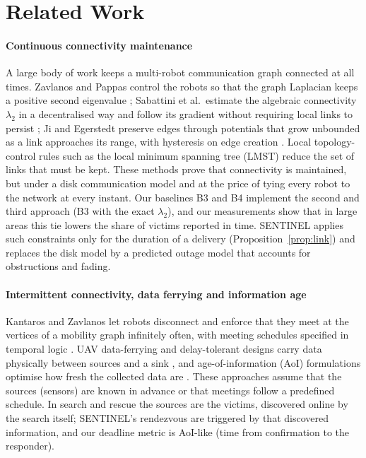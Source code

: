 \section{Related Work}\label{sec:related}

\paragraph{Continuous connectivity maintenance}
A large body of work keeps a multi-robot communication graph connected at all times. Zavlanos and
Pappas control the robots so that the graph Laplacian keeps a positive second eigenvalue
\cite{zavlanos2008}; Sabattini et al.\ estimate the algebraic connectivity $\lambda_2$ in a
decentralised way and follow its gradient without requiring local links to persist
\cite{sabattini2013}; Ji and Egerstedt preserve edges through potentials that grow unbounded as a
link approaches its range, with hysteresis on edge creation \cite{ji2007}. Local topology-control
rules such as the local minimum spanning tree (LMST) \cite{li2003lmst} reduce the set of links that
must be kept. These methods prove that connectivity is maintained, but under a disk communication
model and at the price of tying every robot to the network at every instant. Our baselines B3 and B4
implement the second and third approach (B3 with the exact $\lambda_2$), and our measurements show
that in large areas this tie lowers the share of victims reported in time. SENTINEL applies such
constraints only for the duration of a delivery (Proposition~\ref{prop:link}) and replaces the disk model by a predicted outage
model that accounts for obstructions and fading.

\paragraph{Intermittent connectivity, data ferrying and information age}
Kantaros and Zavlanos let robots disconnect and enforce that they meet at the vertices of a mobility
graph infinitely often, with meeting schedules specified in temporal logic \cite{kantaros2017}.
UAV data-ferrying and delay-tolerant designs carry data physically between sources and a sink
\cite{cui2023ferry,chandran2024disaster}, and age-of-information (AoI) formulations optimise how fresh the
collected data are \cite{kaul2012aoi,amodu2023aoi,bafarassat2026aoi}. These approaches assume that the sources (sensors) are
known in advance or that meetings follow a predefined schedule. In search and rescue the sources
are the victims, discovered online by the search itself; SENTINEL's rendezvous are triggered by
that discovered information, and our deadline metric is AoI-like (time from confirmation to the
responder).

